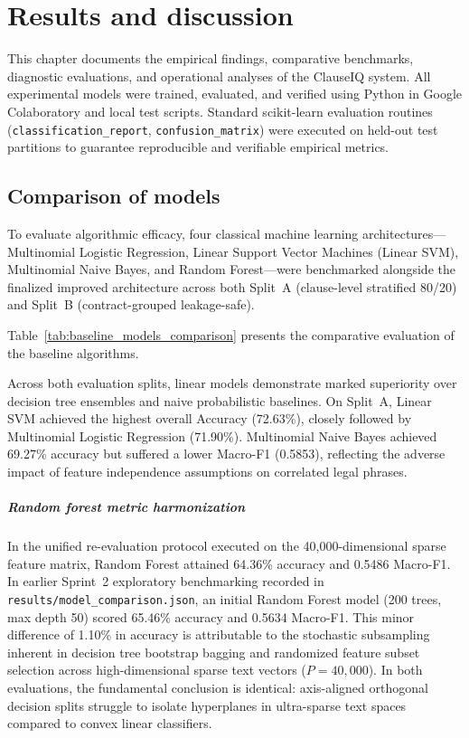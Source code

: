 \chapter{Results and discussion}
\label{ch:results_and_discussion}

This chapter documents the empirical findings, comparative benchmarks, diagnostic evaluations, and operational analyses of the ClauseIQ system. All experimental models were trained, evaluated, and verified using Python in Google Colaboratory and local test scripts. Standard scikit-learn evaluation routines (\texttt{classification\_report}, \texttt{confusion\_matrix}) were executed on held-out test partitions to guarantee reproducible and verifiable empirical metrics.

\section{Comparison of models}
\label{sec:comparison_models}

To evaluate algorithmic efficacy, four classical machine learning architectures---Multinomial Logistic Regression, Linear Support Vector Machines (Linear SVM), Multinomial Naive Bayes, and Random Forest---were benchmarked alongside the finalized improved architecture across both Split~A (clause-level stratified 80/20) and Split~B (contract-grouped leakage-safe).

Table~\ref{tab:baseline_models_comparison} presents the comparative evaluation of the baseline algorithms.



Across both evaluation splits, linear models demonstrate marked superiority over decision tree ensembles and naive probabilistic baselines. On Split~A, Linear SVM achieved the highest overall Accuracy (72.63\%), closely followed by Multinomial Logistic Regression (71.90\%). Multinomial Naive Bayes achieved 69.27\% accuracy but suffered a lower Macro-F1 (0.5853), reflecting the adverse impact of feature independence assumptions on correlated legal phrases. 

\paragraph*{Random forest metric harmonization}
In the unified re-evaluation protocol executed on the 40,000-dimensional sparse feature matrix, Random Forest attained 64.36\% accuracy and 0.5486 Macro-F1. In earlier Sprint~2 exploratory benchmarking recorded in \texttt{results/model\_comparison.json}, an initial Random Forest model (200 trees, max depth 50) scored 65.46\% accuracy and 0.5634 Macro-F1. This minor difference of 1.10\% in accuracy is attributable to the stochastic subsampling inherent in decision tree bootstrap bagging and randomized feature subset selection across high-dimensional sparse text vectors ($P = 40,000$). In both evaluations, the fundamental conclusion is identical: axis-aligned orthogonal decision splits struggle to isolate hyperplanes in ultra-sparse text spaces compared to convex linear classifiers.

